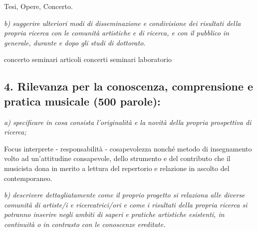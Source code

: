 \documentclass{gs-adonis}
\begin{document}
Tesi, Opere, Concerto.

\emph{b) suggerire ulteriori modi di disseminazione e condivisione dei risultati della propria ricerca con le comunità artistiche e di ricerca, e con il pubblico in generale, durante e dopo gli studi di dottorato.}

concerto
seminari
articoli
concerti seminari
laboratorio

\subsection{4. Rilevanza per la conoscenza, comprensione e pratica musicale (500 parole):}

\emph{a) specificare in cosa consista l’originalità e la novità della propria prospettiva di ricerca;}

Focus interprete - responsabilità - cosapevolezza
nonché metodo di insegnamento volto ad un'attitudine consapevole, dello strumento e del
contributo che il musicista dona in merito a lettura del repertorio e relazione in ascolto
del contemporaneo.

\emph{b) descrivere dettagliatamente come il proprio progetto si relaziona alle diverse comunità di artiste/i e ricercatrici/ori e come i risultati della propria ricerca si potranno inserire negli ambiti di saperi e pratiche artistiche esistenti, in continuità o in contrasto con le conoscenze ereditate.}

\raggedright
\nocite{*}
%
\printbibliography
\end{document}
